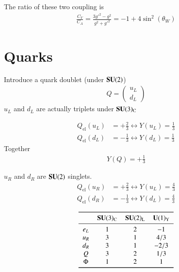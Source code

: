 The ratio of these two coupling is
\begin{align}
   \frac{C_V}{C_A} = \frac{3g'^2 - g^2}{g^2 + g'^2} = -1 + 4 \sin^2(\theta_W)
\end{align}

\section{Quarks}
Introduce a quark doublet (under $\mathbf{SU}(2)$)
\begin{align}
   Q = \begin{pmatrix} u_L \\ d_L \end{pmatrix}
\end{align}
$u_L$ and $d_L$ are actually triplets under $\mathbf{SU}(3)_\text{C}$

\begin{align*}
   Q_\text{el}(u_L) &= + \frac{2}{3}  \leftrightarrow  Y(u_L)  = \frac{1}{3} \\
   Q_\text{el}(d_L) &= - \frac{1}{3}  \leftrightarrow Y(d_L)  = \frac{1}{3}
\end{align*}
Together
\begin{align}
   Y(Q) = + \frac{1}{3}
\end{align}

$u_R$ and $d_R$ are $\mathbf{SU}(2)$ singlets.
\begin{align*}
   Q_\text{el}(u_R) &= + \frac{2}{3}  \leftrightarrow  Y(u_L) = \frac{4}{3} \\
   Q_\text{el}(d_R) &= - \frac{1}{3}  \leftrightarrow Y(d_L) = \frac{4}{3}
\end{align*}

\begin{align*}
 \begin{tabular}{cccc}
   \toprule
& $\SU(3)_\text{C}$ & $\SU(2)_\text{L}$ & $\Uni(1)_\text{Y}$ \\
\midrule
   $e_L$ &  $1$ & $2$ & $-1$ \\
$u_R$ & $3$ & $1$ & $4/3$ \\
$d_R$ & $3$ & $1$ & $-2/3$ \\
$Q$ & $3$ & $2$ & $1/3$ \\
$\Phi$ & $1$ & $2$ & $1$ \\
\bottomrule
\end{tabular}
\end{align*}

